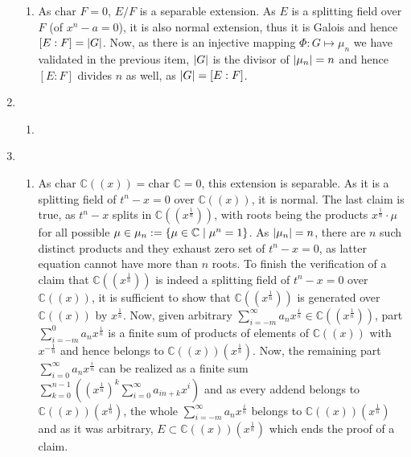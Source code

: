 \documentclass[8pt]{article} %
\begin{document}
\begin{enumerate}[label=\bfseries Problem \arabic*.]
{\begin{enumerate}[label=(\arabic*).]
{				Now, if $\Phi(\sigma)=\sigma(\alpha)/\alpha=1$
				for $\sigma\in Gal(E/F)$, this means that $\forall\alpha,\;\alpha^n=a\implies\sigma(\alpha)=\alpha$, thus $\sigma$ fixes
				zeros of $x^n-a=0$. As splitting field $E$ is generated by zeros of $x^n-a$, the fact that $\sigma$ fixes these zeros as well as $F$
				implies that $\sigma$ fixes $E$, that is $\sigma=id_E$ and this shows injectiveness.
				}
			\item{As $\mbox{char }F=0$, $E/F$ is a separable extension. As $E$ is a splitting field over $F$ (of $x^n-a=0$), it is also normal extension,
				thus it is Galois and hence $[E:F]=\left|G\right|$. Now, as there is an injective mapping $\Phi:G\mapsto \mu_n$ we have validated
				in the previous item, $\left|G\right|$ is the divisor of $\left|\mu_n\right|=n$ and hence $[E:F]$ divides $n$ as well, as $\left|G\right|=[E:F]$.
				}
		\end{enumerate}
		}
	\item{
		\begin{enumerate}[label=(\arabic*).]
			\item{
				}
		\end{enumerate}
		}
	\item{
		\begin{enumerate}[label=(\arabic*).]
			\newcommand{\E}{\mathbb{C}((x^{\frac{1}{n}}))}
			\newcommand{\F}{\mathbb{C}((x))}
			\item{As $\mbox{char }\mathbb{C}((x))=\mbox{char }\mathbb{C}=0$, this extension is separable. As it is a splitting field of $t^n-x=0$ over
				$\mathbb{C}((x))$, it is normal. The last claim is true, as $t^n-x$ splits in $\mathbb{C}((x^{\frac{1}{n}}))$, with roots
				being the products $x^{\frac{1}{n}}\cdot\mu$ for all possible $\mu\in\mu_n:=\left\{\mu\in\mathbb{C}\mid \mu^n=1\right\}$. As
				$\left|\mu_n\right|=n$, there are $n$ such distinct products and they exhaust zero set of $t^n-x=0$, as latter equation cannot
				have more than $n$ roots. To finish the verification of a claim that $\mathbb{C}((x^{\frac{1}{n}}))$ is indeed a splitting field
				of $t^n-x=0$ over $\mathbb{C}((x))$, it is sufficient to show that $\E$ is generated over $\F$ by $x^{\frac{1}{n}}$.
				Now, given arbitrary $\sum_{i=-m}^{\infty}a_nx^{\frac{i}{n}}\in\E$, part $\sum_{i=-m}^0a_nx^{\frac{i}{n}}$ is a finite sum
				of products of elements of $\F$ with $x^{-\frac{1}{n}}$ and hence belongs to $\F(x^{\frac{1}{n}})$. Now, the remaining
				part $\sum_{i=0}^\infty a_nx^{\frac{i}{n}}$ can be realized as a finite sum
				$\sum_{k=0}^{n-1}\left((x^{\frac{1}{n}})^k\sum_{i=0}^\infty a_{in+k}x^i\right)$ and as every addend belongs to
				$\F(x^{\frac{1}{n}})$, the whole $\sum_{i=-m}^{\infty}a_nx^{\frac{i}{n}}$ belongs to $\F(x^{\frac{1}{n}})$ and as it was
				arbitrary, $E\subset\F(x^{\frac{1}{n}})$ which ends the proof of a claim.

}
\end{enumerate}}
\end{enumerate}
\end{document}
